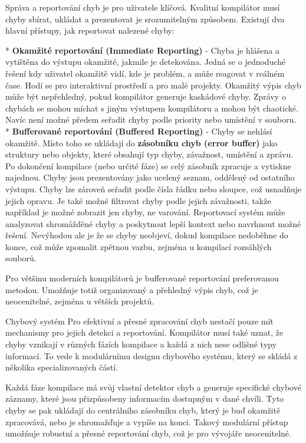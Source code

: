 Správa a reportování chyb je pro uživatele klíčová. Kvalitní kompilátor musí chyby sbírat, ukládat a prezentovat je srozumitelným způsobem. Existují dva hlavní přístupy, jak reportovat nalezené chyby:

\begitems
* {\bf Okamžité reportování (Immediate Reporting)} - Chyba je hlášena a vytištěna do výstupu okamžitě, jakmile je detekována. Jedná se o jednoduché řešení kdy uživatel okamžitě vidí, kde je problém, a může reagovat v reálném čase. Hodí se pro interaktivní prostředí a pro malé projekty. Okamžitý výpis chyb může být nepřehledný, pokud kompilátor generuje kaskádové chyby. Zprávy o chybách se mohou míchat s jiným výstupem kompilátoru a mohou být chaotické. Navíc není možné předem seřadit chyby podle priority nebo umístění v souboru.
* {\bf Bufferované reportování (Buffered Reporting)} - Chyby se nehlásí okamžitě. Místo toho se ukládají do {\bf zásobníku chyb (error buffer)} jako struktury nebo objekty, které obsahují typ chyby, závažnost, umístění a zprávu. Po dokončení kompilace (nebo určité fáze) se celý zásobník zpracuje a vytiskne najednou. Chyby jsou prezentovány jako ucelený seznam, oddělený od ostatního výstupu. Chyby lze zároveň seřadit podle čísla řádku nebo sloupce, což usnadňuje jejich opravu. Je také možné filtrovat chyby podle jejich závažnosti, takže například je možné zobrazit jen chyby, ne varování. Reportovací systém může analyzovat shromážděné chyby a poskytnout lepší kontext nebo navrhnout možné řešení. Nevýhodou ale je že se chyby neobjeví, dokud kompilace nedoběhne do konce, což může zpomalit zpětnou vazbu, zejména u kompilací rozsáhlých souborů. 
\enditems

Pro většinu moderních kompilátorů je bufferované reportování preferovanou metodou. Umožňuje totiž organizovaný a přehledný výpis chyb, což je neocenitelné, zejména u větších projektů.

\sec Chybový systém
Pro efektivní a přesné zpracování chyb nestačí pouze mít mechanismy pro jejich detekci a reportování. Kompilátor musí také uznat, že chyby vznikají v různých fázích kompilace a každá z nich nese odlišné typy informací. To vede k modulárnímu designu chybového systému, který se skládá z několika specializovaných částí.

Každá fáze kompilace má svůj vlastní detektor chyb a generuje specifické chybové záznamy, které jsou přizpůsobeny informacím dostupným v dané chvíli. Tyto chyby se pak ukládají do centrálního zásobníku chyb, který je buď okamžitě zpracovává, nebo je shromažďuje a vypíše na konci. Takový modulární přístup umožňuje robustní a přesné reportování chyb, což je pro vývojáře neocenitelné.

